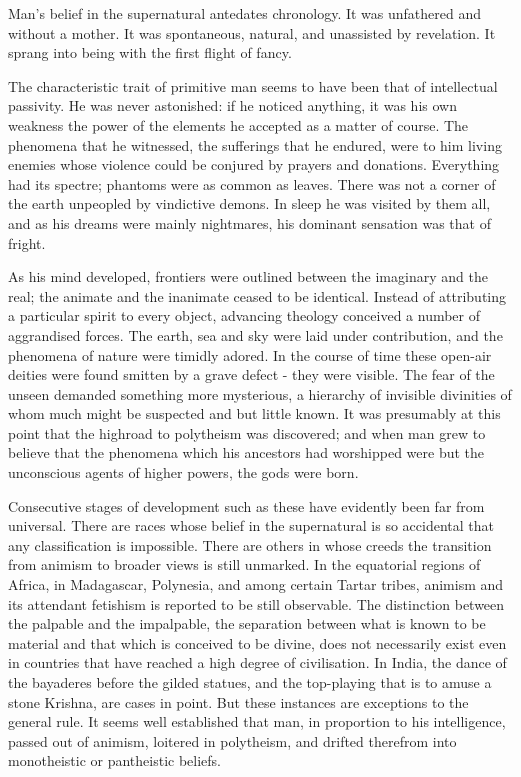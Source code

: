 \documentclass[]{book}
\begin{document}
Man's belief in the supernatural antedates chronology. It was unfathered
and without a mother. It was spontaneous, natural, and unassisted by
revelation. It sprang into being with the first flight of fancy.

The characteristic trait of primitive man seems to have been that of
intellectual passivity. He was never astonished: if he noticed anything,
it was his own weakness the power of the elements he accepted as a
matter of course. The phenomena that he witnessed, the sufferings that
he endured, were to him living enemies whose violence could be conjured
by prayers and donations. Everything had its spectre; phantoms were as
common as leaves. There was not a corner of the earth unpeopled by
vindictive demons. In sleep he was visited by them all, and as his
dreams were mainly nightmares, his dominant sensation was that of
fright.

As his mind developed, frontiers were outlined between the imaginary and
the real; the animate and the inanimate ceased to be identical. Instead
of attributing a particular spirit to every object, advancing theology
conceived a number of aggrandised forces. The earth, sea and sky were
laid under contribution, and the phenomena of nature were timidly
adored. In the course of time these open-air deities were found smitten
by a grave defect - they were visible. The fear of the unseen demanded
something more mysterious, a hierarchy of invisible divinities of whom
much might be suspected and but little known. It was presumably at this
point that the highroad to polytheism was discovered; and when man grew
to believe that the phenomena which his ancestors had worshipped were
but the unconscious agents of higher powers, the gods were born.

Consecutive stages of development such as these have evidently been far
from universal. There are races whose belief in the supernatural is so
accidental that any classification is impossible. There are others in
whose creeds the transition from animism to broader views is still
unmarked. In the equatorial regions of Africa, in Madagascar, Polynesia,
and among certain Tartar tribes, animism and its attendant fetishism is
reported to be still observable. The distinction between the palpable
and the impalpable, the separation between what is known to be material
and that which is conceived to be divine, does not necessarily exist
even in countries that have reached a high degree of civilisation. In
India, the dance of the bayaderes before the gilded statues, and the
top-playing that is to amuse a stone Krishna, are cases in point. But
these instances are exceptions to the general rule. It seems well
established that man, in proportion to his intelligence, passed out of
animism, loitered in polytheism, and drifted therefrom into monotheistic
or pantheistic beliefs.
\end{document}
